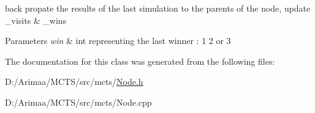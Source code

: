 back propate the results of the last simulation to the parents of the node, update \+\_\+visits \& \+\_\+wins 


\begin{DoxyParams}{Parameters}
{\em win} & int representing the last winner \+: 1 2 or 3 \\
\hline
\end{DoxyParams}


The documentation for this class was generated from the following files\+:\begin{DoxyCompactItemize}
\item 
D\+:/\+Arimaa/\+M\+C\+T\+S/src/mcts/\hyperlink{_node_8h}{Node.\+h}\item 
D\+:/\+Arimaa/\+M\+C\+T\+S/src/mcts/Node.\+cpp\end{DoxyCompactItemize}
